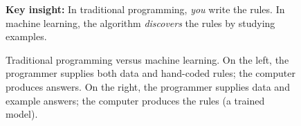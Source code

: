 \begin{figure}[ht]

\vspace{1em}

\begin{tcolorbox}[
    colback=blue!3!white,
    colframe=blue!40!black,
    arc=2pt,
    boxrule=0.5pt,
    width=0.95\textwidth,
    halign=center,
    top=3pt, bottom=3pt
]
\textbf{Key insight:} In traditional programming, \emph{you} write the rules. In machine learning, the algorithm \emph{discovers} the rules by studying examples.
\end{tcolorbox}

\caption{Traditional programming versus machine learning. On the left, the programmer supplies both data and hand-coded rules; the computer produces answers. On the right, the programmer supplies data and example answers; the computer produces the rules (a trained model).}
\label{fig:traditional_vs_ml}
\end{figure}